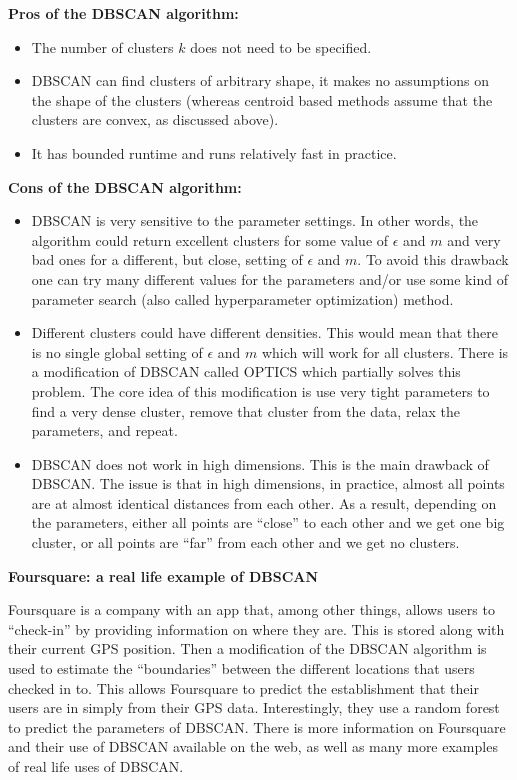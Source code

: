   \noindent\textbf{Pros of the DBSCAN algorithm:}
  \begin{itemize}
    \item The number of clusters $k$ does not need to be specified.
    \item DBSCAN can find clusters of arbitrary shape, it makes no assumptions on the shape of the clusters (whereas centroid based methods assume that the clusters are convex, as discussed above).
    \item It has bounded runtime and runs relatively fast in practice.
  \end{itemize}

  \noindent\textbf{Cons of the DBSCAN algorithm:}
  \begin{itemize}
    \item DBSCAN is very sensitive to the parameter settings. In other words, the algorithm could return excellent clusters for some value of $\epsilon$ and $m$
    and very bad ones for a different, but close, setting of $\epsilon$ and $m$. To avoid this drawback one can try many different values for the parameters and/or use
    some kind of parameter search (also called hyperparameter optimization) method.
    \item Different clusters could have different densities. This would mean that there is no single global setting of $\epsilon$ and $m$ which will work for all clusters.
    There is a modification of DBSCAN called OPTICS which partially solves this problem. The core idea of this modification is use very tight parameters to find a very
    dense cluster, remove that cluster from the data, relax the parameters, and repeat.
    \item DBSCAN does not work in high dimensions. This is the main drawback of DBSCAN. The issue is that in high dimensions, in practice, almost all points are
    at almost identical distances from each other. As a result, depending on the parameters, either all points are ``close'' to each other and we get one big
    cluster, or all points are ``far'' from each other and we get no clusters.
  \end{itemize}

  \noindent\textbf{Foursquare: a real life example of DBSCAN}

  Foursquare is a company with an app that, among other things, allows users to ``check-in'' by providing information on where they are. This is stored along with their current GPS position.
  Then a modification of the DBSCAN algorithm is used to estimate the ``boundaries'' between the different locations that users checked in to. This allows Foursquare to predict the establishment that
  their users are in simply from their GPS data. Interestingly, they use a random forest to predict the parameters of DBSCAN. There is more information on Foursquare and their use of
  DBSCAN available on the web, as well as many more examples of real life uses of DBSCAN.

